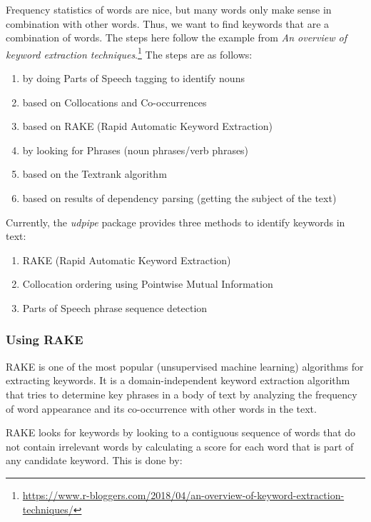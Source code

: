 \documentclass[
]{article}
\providecommand{\tightlist}{%
  \setlength{\itemsep}{0pt}\setlength{\parskip}{0pt}}
\begin{document}
Frequency statistics of words are nice, but many words only make sense in combination with other words. Thus, we want to find keywords that are a combination of words. The steps here follow the example from \emph{An overview of keyword extraction techniques}.\footnote{\url{https://www.r-bloggers.com/2018/04/an-overview-of-keyword-extraction-techniques/}} The steps are as follows:

\begin{enumerate}
\def\labelenumi{\arabic{enumi}.}
\tightlist
\item
  by doing Parts of Speech tagging to identify nouns
\item
  based on Collocations and Co-occurrences
\item
  based on RAKE (Rapid Automatic Keyword Extraction)
\item
  by looking for Phrases (noun phrases/verb phrases)
\item
  based on the Textrank algorithm
\item
  based on results of dependency parsing (getting the subject of the text)
\end{enumerate}

Currently, the \emph{udpipe} package provides three methods to identify keywords in text:

\begin{enumerate}
\def\labelenumi{\arabic{enumi}.}
\tightlist
\item
  RAKE (Rapid Automatic Keyword Extraction)
\item
  Collocation ordering using Pointwise Mutual Information
\item
  Parts of Speech phrase sequence detection
\end{enumerate}

\hypertarget{using-rake}{%
\subsubsection{Using RAKE}\label{using-rake}}

RAKE is one of the most popular (unsupervised machine learning) algorithms for extracting keywords. It is a domain-independent keyword extraction algorithm that tries to determine key phrases in a body of text by analyzing the frequency of word appearance and its co-occurrence with other words in the text.

RAKE looks for keywords by looking to a contiguous sequence of words that do not contain irrelevant words by calculating a score for each word that is part of any candidate keyword. This is done by:
\end{document}
